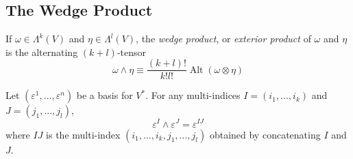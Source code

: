\documentclass{article}
\DeclareMathOperator{\Alt}{Alt}
\newcounter{definition}[section]
\begin{document}
  \subsection{The Wedge Product}

    \begin{definition}
      \label{def:wedge-product}
    If $\omega \in \Lambda^k (V)$ and $\eta \in \Lambda^l (V)$, the \textit{wedge product}, or \textit{exterior product} of $\omega$ and $\eta$ is the alternating $(k+l)$-tensor 
    \begin{equation}
      \omega \wedge \eta \equiv \frac{(k+l)!}{k! l!} \Alt(\omega \otimes \eta)
    \end{equation}
    \end{definition}

    \begin{lemma}
      \label{thm:wedge-product-of-basis-covectors}
    Let $(\varepsilon^1, ..., \varepsilon^n)$ be a basis for $V^*$. For any multi-indices $I = (i_1, ..., i_k)$ and $J = (j_1, ..., j_l)$, 
    \begin{equation}
      \varepsilon^I \wedge \varepsilon^J = \varepsilon^{IJ}
    \end{equation}
    where $IJ$ is the multi-index $(i_1, ..., i_k, j_1, ..., j_l)$ obtained by concatenating $I$ and $J$. 
    \end{lemma}
\end{document}
